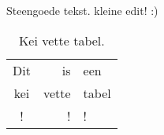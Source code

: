 \documentclass[10pt]{report}
\begin{document}
Steengoede tekst.
kleine edit! :)
\begin{table}[h]
	\centering
	\caption{Kei vette tabel.}
	\label{tb:table}
	\begin{tabular}{crl}
		Dit & is & een \\
		kei & vette & tabel \\
		! & ! & ! \\
	\end{tabular}
\end{table}
\end{document}
